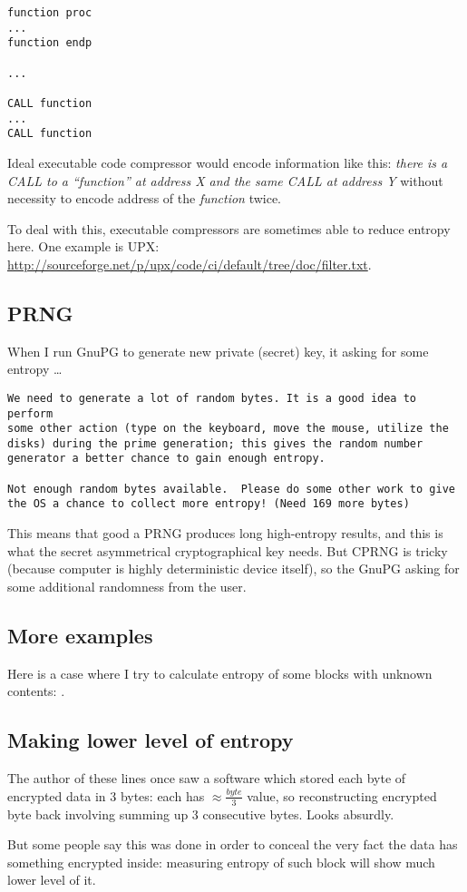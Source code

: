 \begin{lstlisting}[style=customasmx86]
function proc
...
function endp

...

CALL function
...
CALL function
\end{lstlisting}

Ideal executable code compressor would encode information like this:
\emph{there is a CALL to a ``function'' at address X and the same CALL at address Y} without necessity to encode
address of the \emph{function} twice.

To deal with this, executable compressors are sometimes able to reduce entropy here.
One example is UPX: \url{http://sourceforge.net/p/upx/code/ci/default/tree/doc/filter.txt}.

\subsection{\ac{PRNG}}

When I run GnuPG to generate new private (secret) key, it asking for some entropy \dots

\begin{lstlisting}
We need to generate a lot of random bytes. It is a good idea to perform
some other action (type on the keyboard, move the mouse, utilize the
disks) during the prime generation; this gives the random number
generator a better chance to gain enough entropy.

Not enough random bytes available.  Please do some other work to give
the OS a chance to collect more entropy! (Need 169 more bytes)
\end{lstlisting}

This means that good a \ac{PRNG} produces long high-entropy results,
and this is what the secret asymmetrical cryptographical key needs.
But \ac{CPRNG} is tricky (because computer is highly deterministic device itself),
so the GnuPG asking for some additional randomness from the user.

\subsection{More examples}

Here is a case where I try to calculate entropy of some blocks with unknown contents: .



\subsection{Making lower level of entropy}

The author of these lines once saw a software which stored each byte of encrypted data in 3 bytes:
each has {\Large $\approx \frac{byte}{3}$} value, so reconstructing encrypted byte back involving summing up 3 consecutive bytes.
Looks absurdly.

But some people say this was done in order to conceal the very fact
the data has something encrypted inside: measuring entropy of such block will show much lower level of it.

